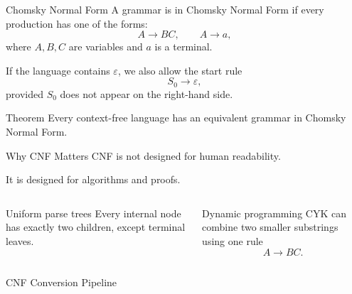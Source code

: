 \documentclass[aspectratio=169,10pt]{beamer}
\newcommand{\eps}{\varepsilon}
\begin{document}
\begin{frame}{Chomsky Normal Form}
\small
A grammar is in \alert{Chomsky Normal Form} if every production has one of the forms:
\[
A\to BC,
\qquad
A\to a,
\]
where \(A,B,C\) are variables and \(a\) is a terminal.

If the language contains \(\eps\), we also allow the start rule
\[
S_0\to\eps,
\]
provided \(S_0\) does not appear on the right-hand side.

\begin{exampleblock}{Theorem}
Every context-free language has an equivalent grammar in Chomsky Normal Form.
\end{exampleblock}
\end{frame}

\begin{frame}{Why CNF Matters}
\small
CNF is not designed for human readability.

\vspace{0.5em}
It is designed for algorithms and proofs.

\begin{columns}[T,onlytextwidth]
\begin{block}{Uniform parse trees}
Every internal node has exactly two children, except terminal leaves.
\end{block}

\begin{exampleblock}{Dynamic programming}
CYK can combine two smaller substrings using one rule
\[
A\to BC.
\]
\end{exampleblock}
\end{columns}
\end{frame}

\begin{frame}{CNF Conversion Pipeline}
\small
\begin{center}
\end{center}
\end{frame}
\end{document}

